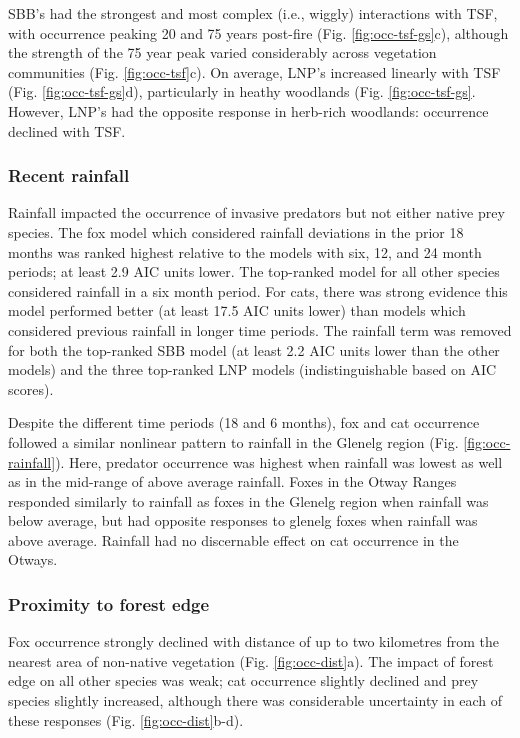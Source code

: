 \documentclass[11pt,a4paper,titlepage,twoside,openright]{style/unimelbthesis}
\begin{document}
\begin{mainmatter}
SBB's had the strongest and most complex (i.e., wiggly) interactions with TSF, with occurrence peaking 20 and 75 years post-fire (Fig. \ref{fig:occ-tsf-gs}c), although the strength of the 75 year peak varied considerably across vegetation communities (Fig. \ref{fig:occ-tsf}c). On average, LNP's increased linearly with TSF (Fig. \ref{fig:occ-tsf-gs}d), particularly in heathy woodlands (Fig. \ref{fig:occ-tsf-gs}. However, LNP's had the opposite response in herb-rich woodlands: occurrence declined with TSF.

\hypertarget{recent-rainfall-1}{%
\subsubsection{Recent rainfall}\label{recent-rainfall-1}}

Rainfall impacted the occurrence of invasive predators but not either native prey species. The fox model which considered rainfall deviations in the prior 18 months was ranked highest relative to the models with six, 12, and 24 month periods; at least 2.9 AIC units lower. The top-ranked model for all other species considered rainfall in a six month period. For cats, there was strong evidence this model performed better (at least 17.5 AIC units lower) than models which considered previous rainfall in longer time periods. The rainfall term was removed for both the top-ranked SBB model (at least 2.2 AIC units lower than the other models) and the three top-ranked LNP models (indistinguishable based on AIC scores).

Despite the different time periods (18 and 6 months), fox and cat occurrence followed a similar nonlinear pattern to rainfall in the Glenelg region (Fig. \ref{fig:occ-rainfall}). Here, predator occurrence was highest when rainfall was lowest as well as in the mid-range of above average rainfall. Foxes in the Otway Ranges responded similarly to rainfall as foxes in the Glenelg region when rainfall was below average, but had opposite responses to glenelg foxes when rainfall was above average. Rainfall had no discernable effect on cat occurrence in the Otways.

\hypertarget{proximity-to-forest-edge-1}{%
\subsubsection{Proximity to forest edge}\label{proximity-to-forest-edge-1}}

Fox occurrence strongly declined with distance of up to two kilometres from the nearest area of non-native vegetation (Fig. \ref{fig:occ-dist}a). The impact of forest edge on all other species was weak; cat occurrence slightly declined and prey species slightly increased, although there was considerable uncertainty in each of these responses (Fig. \ref{fig:occ-dist}b-d).


\end{mainmatter}
\end{document}
